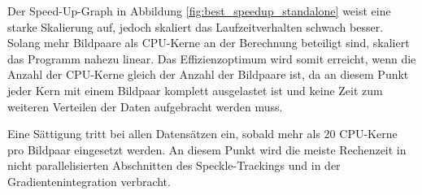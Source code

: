Der Speed-Up-Graph in Abbildung \ref{fig:best_speedup_standalone} weist eine starke Skalierung auf, jedoch skaliert das Laufzeitverhalten schwach besser. Solang mehr Bildpaare als \gls{CPU}-Kerne an der Berechnung beteiligt sind, skaliert das Programm nahezu linear. Das Effizienzoptimum wird somit erreicht, wenn die Anzahl der \gls{CPU}-Kerne gleich der Anzahl der Bildpaare ist, da an diesem Punkt jeder Kern mit einem Bildpaar komplett ausgelastet ist und keine Zeit zum weiteren Verteilen der Daten aufgebracht werden muss. 

Eine Sättigung tritt bei allen Datensätzen ein, sobald mehr als 20 \gls{CPU}-Kerne pro Bildpaar eingesetzt werden. An diesem Punkt wird die meiste Rechenzeit in nicht parallelisierten Abschnitten des Speckle-Trackings und in der Gradientenintegration verbracht.